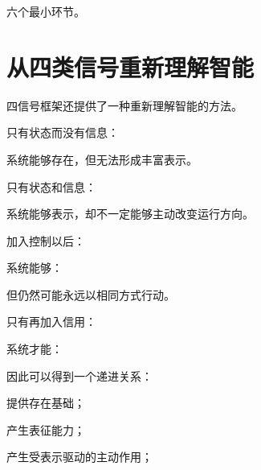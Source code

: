 六个最小环节。

\section{从四类信号重新理解智能}

四信号框架还提供了一种重新理解智能的方法。

只有状态而没有信息：

系统能够存在，但无法形成丰富表示。

只有状态和信息：

系统能够表示，却不一定能够主动改变运行方向。

加入控制以后：

系统能够：

\begin{statementbox}
\centering
{}
\end{statementbox}

但仍然可能永远以相同方式行动。

只有再加入信用：

系统才能：

\begin{statementbox}
\centering
{}
\end{statementbox}

因此可以得到一个递进关系：

\begin{statementbox}
\centering
{}
\end{statementbox}

提供存在基础；

\begin{statementbox}
\centering
{}
\end{statementbox}

产生表征能力；

\begin{statementbox}
\centering
{}
\end{statementbox}

产生受表示驱动的主动作用；

\begin{statementbox}
\centering
{}
\end{statementbox}

